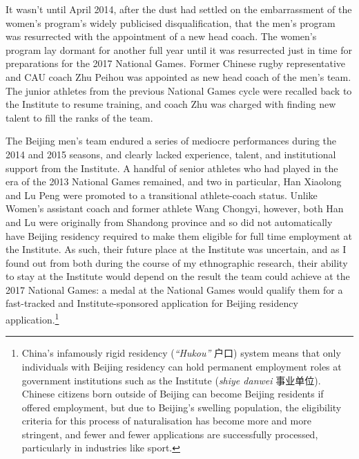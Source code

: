 \begin{CJK}{UTF8}{gbsn}
It wasn't until April 2014, after the dust had settled on the embarrassment of the women's program's widely publicised disqualification, that the men's program was resurrected with the appointment of a new head coach.  The women's program lay dormant for another full year until it was resurrected just in time for preparations for the 2017 National Games. Former Chinese rugby  representative and CAU coach Zhu Peihou was appointed as new head coach of the men's team.  The junior athletes from the previous National Games cycle were recalled back to the Institute to resume training, and coach Zhu was charged with finding new talent to fill the ranks of the team.

The Beijing men's team endured a series of mediocre performances during the 2014 and 2015 seasons, and clearly lacked experience, talent, and institutional support from the Institute.  A handful of senior athletes who had played in the era of the 2013 National Games remained, and two in particular, Han Xiaolong and Lu Peng were promoted to a transitional athlete-coach status. Unlike Women's assistant coach and former athlete Wang Chongyi, however, both Han and Lu were originally from Shandong province and so did not automatically have Beijing residency required to make them eligible for full time employment at the Institute.  As such, their future place at the Institute was uncertain, and as I found out from both during the course of my ethnographic research, their ability to stay at the Institute would depend on the result the team could achieve at the 2017 National Games: a medal at the National Games would qualify them for a fast-tracked and Institute-sponsored application for Beijing residency application.\footnote{China's infamously rigid residency (\textit{``Hukou''} 户口) system means that only individuals with Beijing residency can hold permanent employment roles at government institutions such as the Institute (\textit{shiye danwei} 事业单位).  Chinese citizens born outside of Beijing can become Beijing residents if offered employment, but due to Beijing's swelling population, the eligibility criteria for this process of naturalisation has become more and more stringent, and fewer and fewer applications are successfully processed, particularly in industries like sport.}


\end{CJK}
